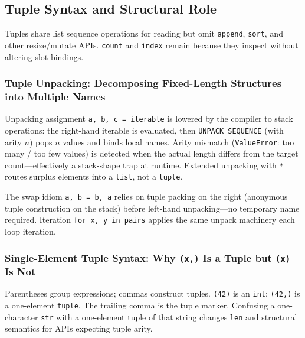 \subsection{Tuple Syntax and Structural Role}

Tuples share list sequence operations for reading but omit \texttt{append}, \texttt{sort}, and other resize/mutate APIs. \texttt{count} and \texttt{index} remain because they inspect without altering slot bindings.

\subsubsection{Tuple Unpacking: Decomposing Fixed-Length Structures into Multiple Names}

Unpacking assignment \texttt{a, b, c = iterable} is lowered by the compiler to stack operations: the right-hand iterable is evaluated, then \texttt{UNPACK\_SEQUENCE} (with arity $n$) pops $n$ values and binds local names. Arity mismatch (\texttt{ValueError}: too many / too few values) is detected when the actual length differs from the target count---effectively a stack-shape trap at runtime. Extended unpacking with \texttt{*} routes surplus elements into a \texttt{list}, not a \texttt{tuple}.

The swap idiom \texttt{a, b = b, a} relies on tuple packing on the right (anonymous tuple construction on the stack) before left-hand unpacking---no temporary name required. Iteration \texttt{for x, y in pairs} applies the same unpack machinery each loop iteration.

\subsubsection{Single-Element Tuple Syntax: Why \texttt{(x,)} Is a Tuple but \texttt{(x)} Is Not}

Parentheses group expressions; commas construct tuples. \texttt{(42)} is an \texttt{int}; \texttt{(42,)} is a one-element \texttt{tuple}. The trailing comma is the tuple marker. Confusing a one-character \texttt{str} with a one-element tuple of that string changes \texttt{len} and structural semantics for APIs expecting tuple arity.

